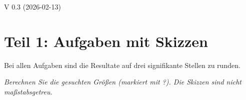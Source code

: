 

\usetikzlibrary{angles, quotes, calc, babel}


\renewcommand{\bbwAufgabenBlockID}{AllgDreieck}

\renewcommand{\metaHeaderLine}{Allgemeines Dreieck}
\renewcommand{\arbeitsblattTitel}{Sinus- und Cosinussatz}

\ifisNURAUFGABEN
\renewcommand{\abplz}[1]{\vspace{1mm}}
\fi

\newcommand{\seitenUmbruchImAufgabenteil}{
\ifisNURAUFGABEN
\else
\noTRAINER{\newpage}
\fi
}%


\arbeitsblattHeader{}

\begin{center}V 0.3 (2026-02-13) \end{center}
\section{Teil 1: Aufgaben mit Skizzen}

Bei allen Aufgaben sind die Resultate auf drei signifikante Stellen zu runden.

\textit{Berechnen Sie die gesuchten Größen (markiert mit ?). Die Skizzen sind nicht maßstabsgetreu.}

